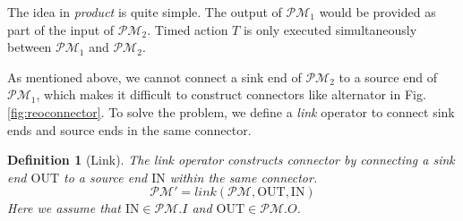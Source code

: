 \documentclass[conference, a4paper]{IEEEtran}
\newtheorem{definition}{Definition}
\newcommand{\OUT}[0]{\mbox{OUT}}
\newcommand{\IN}[0]{\mbox{IN}}
\begin{document}
The idea in \emph{product} is quite simple. The output of $\mathcal{PM}_1$ would be provided as part of the
input of $\mathcal{PM}_2$. Timed action $T$ is only executed simultaneously between $\mathcal{PM}_1$
and $\mathcal{PM}_2$.

As mentioned above, we cannot connect a sink end of $\mathcal{PM}_2$ to a source end of
$\mathcal{PM}_1$, which makes it difficult to construct connectors like alternator in Fig.
\ref{fig:reoconnector}. To solve the problem, we define a \emph{link} operator to connect sink
ends and source ends in the same connector.

\begin{definition}[Link]
  The \emph{link} operator constructs connector by connecting a sink end $\OUT$ to a source end $\IN$
  within the same connector.   
  \[
  \mathcal{PM}' = link(\mathcal{PM}, \OUT, \IN)
  \]
  Here we assume that $\IN\in \mathcal{PM}.I$ and $\OUT\in \mathcal{PM}.O$.


\end{definition}
\end{document}
